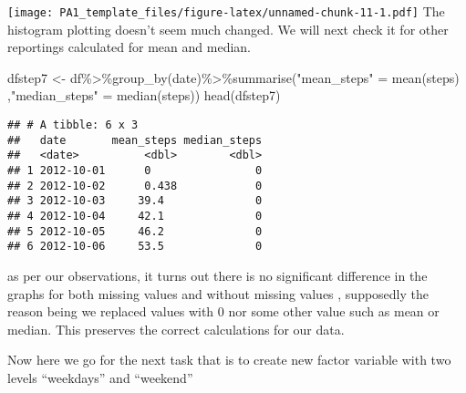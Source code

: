 \documentclass[
]{article}
\newenvironment{Shaded}{\begin{snugshade}}{\end{snugshade}}
\newcommand{\FunctionTok}[1]{\textcolor[rgb]{0.00,0.00,0.00}{#1}}
\newcommand{\NormalTok}[1]{#1}
\newcommand{\OtherTok}[1]{\textcolor[rgb]{0.56,0.35,0.01}{#1}}
\newcommand{\SpecialCharTok}[1]{\textcolor[rgb]{0.00,0.00,0.00}{#1}}
\newcommand{\StringTok}[1]{\textcolor[rgb]{0.31,0.60,0.02}{#1}}
\begin{document}
\texttt{[image: PA1\_template\_files/figure-latex/unnamed-chunk-11-1.pdf]}
The histogram plotting doesn't seem much changed. We will next check it
for other reportings calculated for mean and median.

\begin{Shaded}
\begin{Highlighting}[]
\NormalTok{dfstep7 }\OtherTok{\textless{}{-}}\NormalTok{ df}\SpecialCharTok{\%\textgreater{}\%}\FunctionTok{group\_by}\NormalTok{(date)}\SpecialCharTok{\%\textgreater{}\%}\FunctionTok{summarise}\NormalTok{(}\StringTok{"mean\_steps"} \OtherTok{=} \FunctionTok{mean}\NormalTok{(steps)}
\NormalTok{                                           ,}\StringTok{"median\_steps"} \OtherTok{=} \FunctionTok{median}\NormalTok{(steps))}
\FunctionTok{head}\NormalTok{(dfstep7)}
\end{Highlighting}
\end{Shaded}

\begin{verbatim}
## # A tibble: 6 x 3
##   date       mean_steps median_steps
##   <date>          <dbl>        <dbl>
## 1 2012-10-01      0                0
## 2 2012-10-02      0.438            0
## 3 2012-10-03     39.4              0
## 4 2012-10-04     42.1              0
## 5 2012-10-05     46.2              0
## 6 2012-10-06     53.5              0
\end{verbatim}

as per our observations, it turns out there is no significant difference
in the graphs for both missing values and without missing values ,
supposedly the reason being we replaced values with 0 nor some other
value such as mean or median. This preserves the correct calculations
for our data.

Now here we go for the next task that is to create new factor variable
with two levels ``weekdays'' and ``weekend''
\end{document}
